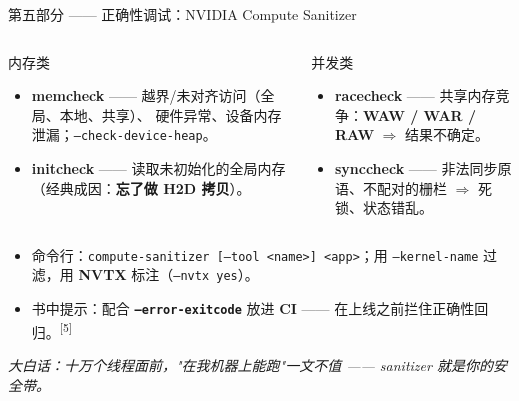\documentclass[aspectratio=169]{beamer}
\newcommand{\kw}[1]{\textbf{\textcolor{kwblue}{#1}}}
\newcommand{\pe}[1]{{\footnotesize\itshape 大白话：#1}}
\newcommand{\refmark}[1]{\textsuperscript{[#1]}}
\begin{document}
\begin{frame}{第五部分 —— 正确性调试：NVIDIA Compute Sanitizer}
  \begin{columns}[t]
    \begin{block}{内存类}
      \begin{itemize}\small
        \item \kw{memcheck} —— 越界/未对齐访问（全局、本地、共享）、
              硬件异常、设备内存泄漏；\texttt{--check-device-heap}。
        \item \kw{initcheck} —— 读取未初始化的全局内存
              （经典成因：\kw{忘了做 H2D 拷贝}）。
      \end{itemize}
    \end{block}
    \begin{exampleblock}{并发类}
      \begin{itemize}\small
        \item \kw{racecheck} —— 共享内存竞争：\kw{WAW / WAR / RAW}
              $\Rightarrow$ 结果不确定。
        \item \kw{synccheck} —— 非法同步原语、不配对的栅栏
              $\Rightarrow$ 死锁、状态错乱。
      \end{itemize}
    \end{exampleblock}
  \end{columns}
  \medskip
  \begin{itemize}
    \item 命令行：\texttt{compute-sanitizer [--tool <name>] <app>}；用
          \texttt{--kernel-name} 过滤，用 \kw{NVTX} 标注（\texttt{--nvtx yes}）。
    \item 书中提示：配合 \kw{\texttt{--error-exitcode}} 放进 \kw{CI} ——
          在上线之前拦住正确性回归。\refmark{5}
  \end{itemize}
  \medskip
  \pe{十万个线程面前，"在我机器上能跑"一文不值 —— sanitizer 就是你的安全带。}
\end{frame}
\end{document}
